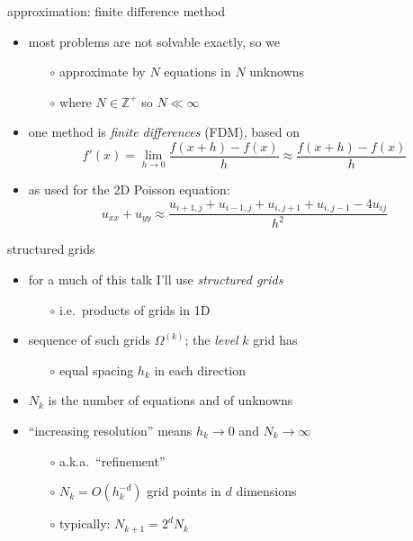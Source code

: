 \documentclass[hide notes,intlimits,usenames,dvipsnames]{beamer}
\newcommand{\ZZ}{\mathbb{Z}}
\begin{document}
\begin{frame}{approximation: finite difference method}
\begin{itemize}
\item most problems are not solvable exactly, so we
	\begin{itemize}
	\item[$\circ$] \alert{approximate by $N$ equations in $N$ unknowns}
	\item[$\circ$] where $N\in\ZZ^+$ so $N \ll \infty$
	\end{itemize}
\item one method is \emph{finite differences} (FDM), based on
	    $$f'(x) = \lim_{h \to 0} \frac{f(x+h)-f(x)}{h} \approx \frac{f(x+h)-f(x)}{h}$$
\item as used for the 2D Poisson equation:
	    $$u_{xx}+u_{yy} \approx \frac{u_{i+1,j} + u_{i-1,j} + u_{i,j+1} + u_{i,j-1} - 4 u_{ij}}{h^2}$$
\end{itemize}
\end{frame}


\begin{frame}{structured grids}
\begin{itemize}
\item for a much of this talk I'll use \emph{structured grids}
	\begin{itemize}
	\item[$\circ$] i.e.~products of grids in 1D
	\end{itemize}
\item sequence of such grids $\Omega^{(k)}$; the \emph{level} $k$ grid has
	\begin{itemize}
	\item[$\circ$] equal spacing $h_k$ in each direction
	\end{itemize}

\bigskip
\begin{tikzpicture}[scale=1.6]

\end{tikzpicture}

\medskip
\item $N_k$ is the number of equations and of unknowns
\item ``increasing resolution'' means $h_k \to 0$ and $N_k \to \infty$
	\begin{itemize}
	\item[$\circ$] a.k.a.~``refinement''
    \item[$\circ$] $N_k = O(h_k^{-d})$ grid points in $d$ dimensions
	\item[$\circ$] typically: $N_{k+1} = 2^d N_k$
	\end{itemize}
\end{itemize}
\end{frame}
\end{document}
